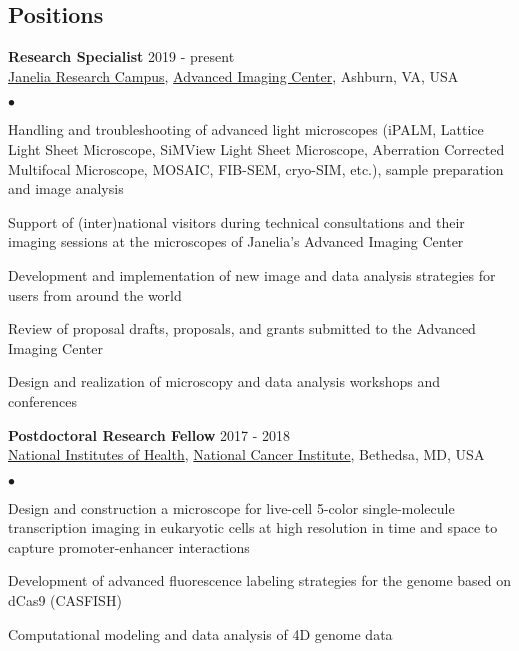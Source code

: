 \documentclass[margin,line]{res}
\newenvironment{list2}{
  \begin{list}{$\bullet$}{%
      \setlength{\itemsep}{0in}
      \setlength{\parsep}{0in} \setlength{\parskip}{0in}
      \setlength{\topsep}{0in} \setlength{\partopsep}{0in} 
      \setlength{\leftmargin}{0.2in}}}{\end{list}}
\begin{document}
\begin{resume}

\section{\sc Positions}
{\bf Research Specialist} \hfill {2019 - present}\\
\href{https://www.janelia.org/}{Janelia Research Campus}, \href{https://www.aicjanelia.org/}{Advanced Imaging Center}, Ashburn, VA, USA\\
 \vspace*{-2mm}
\begin{list2}
\vspace*{-1mm}
\item Handling and troubleshooting of  advanced light microscopes (iPALM, Lattice Light Sheet Microscope, SiMView Light Sheet Microscope, Aberration Corrected Multifocal Microscope, MOSAIC, FIB-SEM, cryo-SIM, etc.), sample preparation and image analysis
\item Support of (inter)national visitors during technical consultations and their imaging sessions at the microscopes of  Janelia's Advanced Imaging Center
\item Development and implementation of  new image and data analysis strategies for users from around the world
\item Review of proposal drafts,  proposals, and grants submitted to the Advanced Imaging Center
\item Design and realization of  microscopy and data analysis workshops and conferences
\end{list2}
{\bf Postdoctoral Research Fellow} \hfill {2017 - 2018}\\
\href{https://www.nih.gov/}{National Institutes of Health}, \href{https://www.cancer.gov/}{National Cancer Institute}, Bethedsa, MD, USA\\
\vspace*{-2mm}
\begin{list2}
\vspace*{-1mm}
\item Design and construction a microscope for live-cell 5-color single-molecule transcription imaging in eukaryotic cells at high resolution in time and space to capture promoter-enhancer interactions 
\item Development of advanced fluorescence labeling strategies for the genome based on dCas9 (CASFISH)
\item Computational modeling and data analysis of 4D genome data
\end{list2}

\end{resume}
\end{document}
